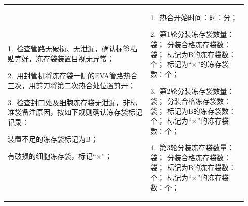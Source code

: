 \documentclass[UTF8,10pt,a4paper,fontset=fandol]{ctexart}
\begin{document}
\begin{center}
\begin{tabular}{|p{0.56\linewidth}|p{0.38\linewidth}|}
\hline
1.\ 检查管路无破损、无泄漏，确认标签粘贴完好，冻存袋装置目视无异常；

2.\ 用封管机将冻存袋一侧的EVA管路热合三次，用剪刀将第二次热合处位置剪开；

3.\ 检查封口处及细胞冻存袋无泄漏，非标准袋备注原因，按如下规则确认冻存袋标记记录：

\hspace{1em}装置不足的冻存袋标记为B；

\hspace{1em}有破损的细胞冻存袋，标记“$\times$”；
&
1.\ 热合开始时间：\underline{\hspace{1.2cm}}时：\underline{\hspace{1.2cm}}分；

2.\ 第1轮分装冻存袋数量：\underline{\hspace{0.8cm}}袋；\newline
\hspace{1em}分装合格冻存袋数：\underline{\hspace{0.8cm}}袋；\newline
\hspace{1em}标记为B的冻存袋数：\underline{\hspace{0.8cm}}个；\newline
\hspace{1em}标记为“$\times$”的冻存袋数：\underline{\hspace{0.8cm}}个；

3.\ 第2轮分装冻存袋数量：\underline{\hspace{0.8cm}}袋；\newline
\hspace{1em}分装合格冻存袋数：\underline{\hspace{0.8cm}}袋；\newline
\hspace{1em}标记为B的冻存袋数：\underline{\hspace{0.8cm}}个；\newline
\hspace{1em}标记为“$\times$”的冻存袋数：\underline{\hspace{0.8cm}}个；

4.\ 第3轮分装冻存袋数量：\underline{\hspace{0.8cm}}袋；\newline
\hspace{1em}分装合格冻存袋数：\underline{\hspace{0.8cm}}袋；\newline
\hspace{1em}标记为B的冻存袋数：\underline{\hspace{0.8cm}}个；\newline
\hspace{1em}标记为“$\times$”的冻存袋数：\underline{\hspace{0.8cm}}个；


\end{tabular}
\end{center}
\end{document}

